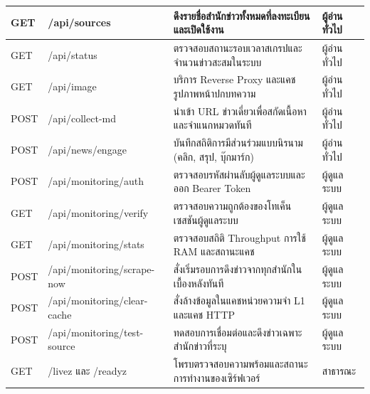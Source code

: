 \begin{longtable}{|C{1.0cm}|L{4.3cm}|L{5.5cm}|L{2.0cm}|}
GET & /api/sources & ดึงรายชื่อสำนักข่าวทั้งหมดที่ลงทะเบียนและเปิดใช้งาน & ผู้อ่านทั่วไป \\ \hline
GET & /api/status & ตรวจสอบสถานะรอบเวลาสเกรปและจำนวนข่าวสะสมในระบบ & ผู้อ่านทั่วไป \\ \hline
GET & /api/image & บริการ Reverse Proxy และแคชรูปภาพหน้าปกบทความ & ผู้อ่านทั่วไป \\ \hline
POST & /api/collect-md & นำเข้า URL ข่าวเดี่ยวเพื่อสกัดเนื้อหาและจำแนกหมวดทันที & ผู้อ่านทั่วไป \\ \hline
POST & /api/news/engage & บันทึกสถิติการมีส่วนร่วมแบบนิรนาม (คลิก, สรุป, บุ๊กมาร์ก) & ผู้อ่านทั่วไป \\ \hline
POST & /api/monitoring/auth & ตรวจสอบรหัสผ่านลับผู้ดูแลระบบและออก Bearer Token & ผู้ดูแลระบบ \\ \hline
GET & /api/monitoring/verify & ตรวจสอบความถูกต้องของโทเค็นเซสชันผู้ดูแลระบบ & ผู้ดูแลระบบ \\ \hline
GET & /api/monitoring/stats & ตรวจสอบสถิติ Throughput การใช้ RAM และสถานะแคช & ผู้ดูแลระบบ \\ \hline
POST & /api/monitoring/scrape-now & สั่งเริ่มรอบการดึงข่าวจากทุกสำนักในเบื้องหลังทันที & ผู้ดูแลระบบ \\ \hline
POST & /api/monitoring/clear-cache & สั่งล้างข้อมูลในแคชหน่วยความจำ L1 และแคช HTTP & ผู้ดูแลระบบ \\ \hline
POST & /api/monitoring/test-source & ทดสอบการเชื่อมต่อและดึงข่าวเฉพาะสำนักข่าวที่ระบุ & ผู้ดูแลระบบ \\ \hline
GET & /livez และ /readyz & โพรบตรวจสอบความพร้อมและสถานะการทำงานของเซิร์ฟเวอร์ & สาธารณะ \\
\hline
\end{longtable}

